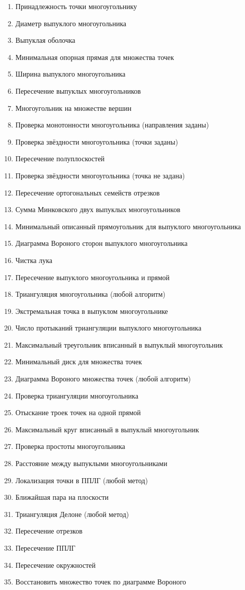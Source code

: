 \documentclass[12pt]{article}
\begin{document}
\begin{enumerate}
	\item Принадлежность точки многоугольнику
	\item Диаметр выпуклого многоугольника
	\item Выпуклая оболочка
	\item Минимальная опорная прямая для множества точек
	\item Ширина выпуклого многоугольника
	\item Пересечение выпуклых многоугольников
	\item Многоугольник на множестве вершин
	\item Проверка монотонности многоугольника (направления заданы)
	\item Проверка звёздности многоугольника (точки заданы)
	\item Пересечение полуплоскостей
	\item Проверка звёздности многоугольника (точка не задана)
	\item Пересечение ортогональных семейств отрезков
	\item Сумма Минковского двух выпуклых многоугольников
	\item Минимальный описанный прямоугольник для выпуклого многоугольника
	\item Диаграмма Вороного сторон выпуклого многоугольника
	\item Чистка лука
	\item Пересечение выпуклого многоугольника и прямой
	\item Триангуляция многоугольника (любой алгоритм)
	\item Экстремальная точка в выпуклом многоугольнике
	\item Число протыканий триангуляции выпуклого многоугольника
	\item Максимальный треугольник вписанный в выпуклый многоугольник
	\item Минимальный диск для множества точек
	\item Диаграмма Вороного множества точек (любой алгоритм)
	\item Проверка триангуляции многоугольника
	\item Отыскание троек точек на одной прямой
	\item Максимальный круг вписанный в выпуклый многоугольник
	\item Проверка простоты многоугольника
	\item Расстояние между выпуклыми многоугольниками
	\item Локализация точки в ППЛГ (любой метод)
	\item Ближайшая пара на плоскости
	\item Триангуляция Делоне (любой метод)
	\item Пересечение отрезков
	\item Пересечение ППЛГ
	\item Пересечение окружностей
	\item Восстановить множество точек по диаграмме Вороного

\end{enumerate}
\end{document}
